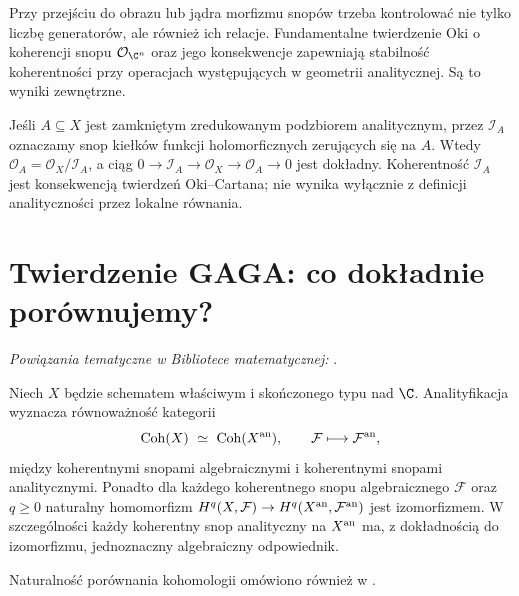 \begin{uwaga}
Przy przejściu do obrazu lub jądra morfizmu snopów trzeba
kontrolować nie tylko liczbę generatorów, ale również ich
relacje. Fundamentalne twierdzenie Oki o koherencji snopu
$\mathcal O_{\C^n}$ oraz jego konsekwencje zapewniają
stabilność koherentności przy operacjach występujących
w geometrii analitycznej. Są to wyniki zewnętrzne.
\end{uwaga}

\begin{przyklad}
Jeśli $A\subseteq X$ jest zamkniętym zredukowanym
podzbiorem analitycznym, przez $\mathcal I_A$ oznaczamy
snop kiełków funkcji holomorficznych zerujących się na $A$.
Wtedy $\mathcal O_A=\mathcal O_X/\mathcal I_A$,
a ciąg
$0\to\mathcal I_A\to\mathcal O_X\to\mathcal O_A\to0$
jest dokładny. Koherentność $\mathcal I_A$ jest
konsekwencją twierdzeń Oki--Cartana; nie wynika wyłącznie
z definicji analityczności przez lokalne równania.
\end{przyklad}

\section{Twierdzenie GAGA: co dokładnie porównujemy?}
\label{sec:ga9-gaga}

\noindent\emph{Powiązania tematyczne w Bibliotece matematycznej:} .


\begin{twierdzenie}
\label{tw:ga9-gaga}
Niech $X$ będzie schematem właściwym i skończonego typu nad $\C$.
Analityfikacja wyznacza równoważność kategorii
\[
 \operatorname{Coh}(X)\ \simeq\ \operatorname{Coh}(X^{\rm an}),
 \qquad \mathcal F\longmapsto\mathcal F^{\rm an},
\]
między koherentnymi snopami algebraicznymi i koherentnymi
snopami analitycznymi. Ponadto dla każdego koherentnego
snopu algebraicznego $\mathcal F$ oraz $q\ge0$ naturalny
homomorfizm
$H^q(X,\mathcal F)\to H^q(X^{\rm an},\mathcal F^{\rm an})$
jest izomorfizmem. W szczególności każdy koherentny
snop analityczny na $X^{\rm an}$ ma, z dokładnością do
izomorfizmu, jednoznaczny algebraiczny odpowiednik.
\end{twierdzenie}

Naturalność porównania kohomologii omówiono również w .

